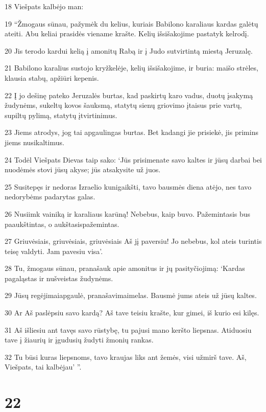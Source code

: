 \par 18 Viešpats kalbėjo man: 
\par 19 “Žmogaus sūnau, pažymėk du kelius, kuriais Babilono karaliaus kardas galėtų ateiti. Abu keliai prasidės viename krašte. Kelių išsišakojime pastatyk kelrodį. 
\par 20 Jis terodo kardui kelią į amonitų Rabą ir į Judo sutvirtintą miestą Jeruzalę. 
\par 21 Babilono karalius sustojo kryžkelėje, kelių išsišakojime, ir buria: maišo strėles, klausia stabų, apžiūri kepenis. 
\par 22 Į jo dešinę pateko Jeruzalės burtas, kad paskirtų karo vadus, duotų įsakymą žudynėms, sukeltų kovos šauksmą, statytų sienų griovimo įtaisus prie vartų, supiltų pylimą, statytų įtvirtinimus. 
\par 23 Jiems atrodys, jog tai apgaulingas burtas. Bet kadangi jie prisiekė, jis primins jiems nusikaltimus. 
\par 24 Todėl Viešpats Dievas taip sako: ‘Jūs prisimenate savo kaltes ir jūsų darbai bei nuodėmės stovi jūsų akyse; jūs atsakysite už juos. 
\par 25 Susitepęs ir nedoras Izraelio kunigaikšti, tavo bausmės diena atėjo, nes tavo nedorybėms padarytas galas. 
\par 26 Nusiimk vainiką ir karaliaus karūną! Nebebus, kaip buvo. Pažemintasis bus paaukštintas, o aukštasis­pažemintas. 
\par 27 Griuvėsiais, griuvėsiais, griuvėsiais Aš jį paversiu! Jo nebebus, kol ateis turintis teisę valdyti. Jam pavesiu visa’. 
\par 28 Tu, žmogaus sūnau, pranašauk apie amonitus ir jų pasityčiojimą: ‘Kardas pagaląstas ir nušveistas žudynėms. 
\par 29 Jūsų regėjimai­apgaulė, pranašavimai­melas. Bausmė jums ateis už jūsų kaltes. 
\par 30 Ar Aš paslėpsiu savo kardą? Aš tave teisiu krašte, kur gimei, iš kurio esi kilęs. 
\par 31 Aš išliesiu ant tavęs savo rūstybę, tu pajusi mano keršto liepsnas. Atiduosiu tave į žiaurių ir įgudusių žudyti žmonių rankas. 
\par 32 Tu būsi kuras liepsnoms, tavo kraujas liks ant žemės, visi užmirš tave. Aš, Viešpats, tai kalbėjau’ ”.



\chapter{22}



